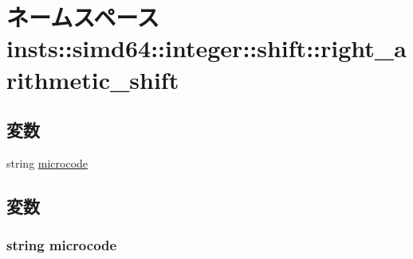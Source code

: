 \hypertarget{namespaceinsts_1_1simd64_1_1integer_1_1shift_1_1right__arithmetic__shift}{
\section{ネームスペース insts::simd64::integer::shift::right\_\-arithmetic\_\-shift}
\label{namespaceinsts_1_1simd64_1_1integer_1_1shift_1_1right__arithmetic__shift}
}
\subsection*{変数}
\begin{DoxyCompactItemize}
\item 
string \hyperlink{namespaceinsts_1_1simd64_1_1integer_1_1shift_1_1right__arithmetic__shift_a770f11a173e99389a8802f0107ed8f52}{microcode}
\end{DoxyCompactItemize}


\subsection{変数}
\hypertarget{namespaceinsts_1_1simd64_1_1integer_1_1shift_1_1right__arithmetic__shift_a770f11a173e99389a8802f0107ed8f52}{
\subsubsection[{microcode}]{\setlength{\rightskip}{0pt plus 5cm}string {\bf microcode}}}
\label{namespaceinsts_1_1simd64_1_1integer_1_1shift_1_1right__arithmetic__shift_a770f11a173e99389a8802f0107ed8f52}
